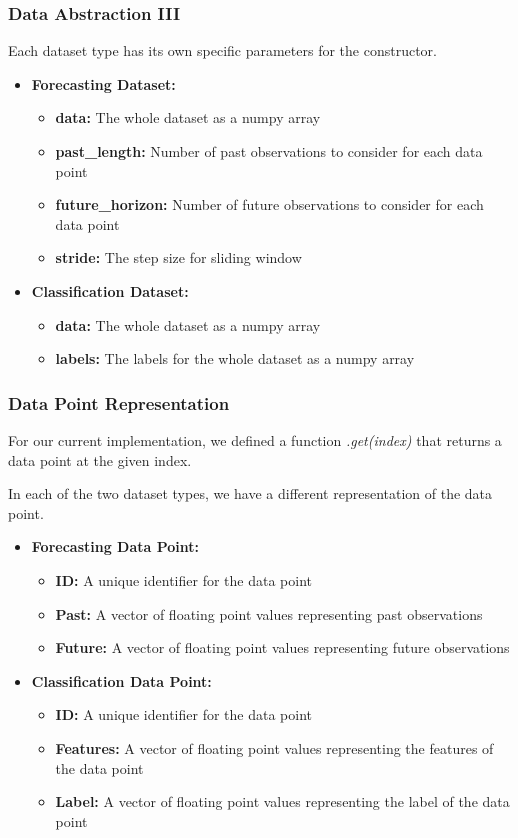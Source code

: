\documentclass[t,english]{beamer}
\begin{document}
\begin{frame}
  \frametitle{Data Abstraction III}
  Each dataset type has its own specific parameters for the constructor.
  \begin{itemize}[]
    \item \textbf{Forecasting Dataset:}
    \begin{itemize}
      \item \textbf{data:} The whole dataset as a numpy array
      \item \textbf{past\_length:} Number of past observations to consider for each data point
      \item \textbf{future\_horizon:} Number of future observations to consider for each data point
      \item \textbf{stride:} The step size for sliding window
    \end{itemize}
    \item \textbf{Classification Dataset:}
    \begin{itemize}
      \item \textbf{data:} The whole dataset as a numpy array
      \item \textbf{labels:} The labels for the whole dataset as a numpy array
    \end{itemize}
  \end{itemize}
  
\end{frame}

\begin{frame}
  \frametitle{Data Point Representation}
  For our current implementation, we defined a function \textit{.get(index)} that returns a data point at the given index.

  In each of the two dataset types, we have a different representation of the data point.
  \begin{itemize}[]
    \item \textbf{Forecasting Data Point:}
    \begin{itemize}
      \item \textbf{ID:} A unique identifier for the data point
      \item \textbf{Past:} A vector of floating point values representing past observations
      \item \textbf{Future:} A vector of floating point values representing future observations
    \end{itemize}
    \item \textbf{Classification Data Point:}
    \begin{itemize}
      \item \textbf{ID:} A unique identifier for the data point
      \item \textbf{Features:} A vector of floating point values representing the features of the data point
      \item \textbf{Label:} A vector of floating point values representing the label of the data point
    \end{itemize}
  \end{itemize}

\end{frame}
\end{document}
